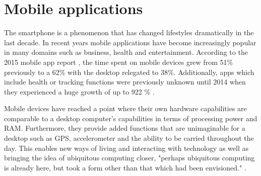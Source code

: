 \section{Mobile applications}
The smartphone is a phenomenon that has changed lifestyles dramatically in the last decade. In recent years mobile applications have become increasingly popular in many domains such as business, health and entertainment. According to the 2015 mobile app report \cite{ComScore}, the time spent on mobile devices grew from 51\% previously to a 62\% with the desktop relegated to 38\%. Additionally, apps which include health or tracking functions were previously unknown until 2014 when they experienced a huge growth of up to 922 \% \cite{ComScore}. 

Mobile devices have reached a point where their own hardware capabilities are comparable to a desktop computer's capabilities in terms of processing power and RAM. Furthermore, they provide added functions that are unimaginable for a desktop such as GPS, accelerometer and the ability to be carried throughout the day. This enables new ways of living and interacting with technology as well as bringing the idea of ubiquitous computing closer, "perhaps ubiquitous computing is already here, but took a form other than that which had been envisioned." \cite{Bell2007}. 

